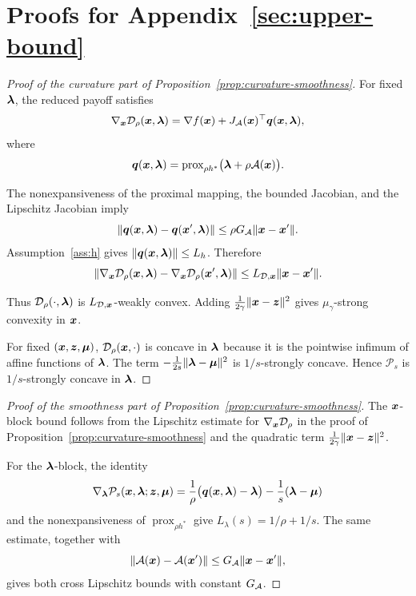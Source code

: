 \section{Proofs for Appendix~\ref{sec:upper-bound}}
\label{app:curvature-smoothness}

\begin{proof}[Proof of the curvature part of Proposition~\ref{prop:curvature-smoothness}]
For fixed $\bm{\lambda}$, the reduced payoff satisfies
\[
    \nabla_{\bm{x}}\mathcal D_\rho(\bm{x},\bm{\lambda})
    =
    \nabla f(\bm{x})+J_{\mathcal{A}}(\bm{x})^\top\bm{q}(\bm{x},\bm{\lambda}),
\]
where
\[
    \bm{q}(\bm{x},\bm{\lambda})
    =
    \operatorname{prox}_{\rho h^*}
    \bigl(\bm{\lambda}+\rho\mathcal{A}(\bm{x})\bigr).
\]

The nonexpansiveness of the proximal mapping, the bounded Jacobian, and
the Lipschitz Jacobian imply
\[
    \|\bm{q}(\bm{x},\bm{\lambda})-\bm{q}(\bm{x}',\bm{\lambda})\|
    \le \rho G_{\mathcal{A}}\|\bm{x}-\bm{x}'\|.
\]
Assumption~\ref{ass:h} gives
\(\|\bm{q}(\bm{x},\bm{\lambda})\|\le L_h\).  Therefore
\[
    \|\nabla_{\bm{x}}\mathcal D_\rho(\bm{x},\bm{\lambda})
    -\nabla_{\bm{x}}\mathcal D_\rho(\bm{x}',\bm{\lambda})\|
    \le L_{\mathcal{D},\bm{x}}\|\bm{x}-\bm{x}'\|.
\]

Thus $\mathcal D_\rho(\cdot,\bm{\lambda})$ is
$L_{\mathcal{D},\bm{x}}$-weakly convex.  Adding
$\frac{1}{2\gamma}\|\bm{x}-\bm{z}\|^2$ gives
$\mu_\gamma$-strong convexity in $\bm{x}$.

For fixed $(\bm{x},\bm{z},\bm{\mu})$, $\mathcal D_\rho(\bm{x},\cdot)$ is concave in
$\bm{\lambda}$ because it is the pointwise infimum of affine functions of
$\bm{\lambda}$.  The term
$-\frac{1}{2s}\|\bm{\lambda}-\bm{\mu}\|^2$ is $1/s$-strongly concave.  Hence
$\mathcal P_s$ is $1/s$-strongly concave in $\bm{\lambda}$.
\end{proof}

\begin{proof}[Proof of the smoothness part of Proposition~\ref{prop:curvature-smoothness}]
The $\bm{x}$-block bound follows from the Lipschitz estimate for
$\nabla_{\bm{x}}\mathcal D_\rho$ in the proof of
Proposition~\ref{prop:curvature-smoothness} and the quadratic term
$\frac{1}{2\gamma}\|\bm{x}-\bm{z}\|^2$.

For the $\bm{\lambda}$-block, the identity
\[
    \nabla_{\bm{\lambda}}\mathcal P_s(\bm{x},\bm{\lambda};\bm{z},\bm{\mu})
    =
    \frac{1}{\rho}
    \bigl(\bm{q}(\bm{x},\bm{\lambda})-\bm{\lambda}\bigr)
    -\frac{1}{s}(\bm{\lambda}-\bm{\mu})
\]
and the nonexpansiveness of
$\operatorname{prox}_{\rho h^*}$ give
$L_\lambda(s)=1/\rho+1/s$.
The same estimate, together with
\[
    \|\mathcal{A}(\bm{x})-\mathcal{A}(\bm{x}')\|
    \le G_{\mathcal{A}}\|\bm{x}-\bm{x}'\|,
\]
gives both cross Lipschitz bounds with constant $G_{\mathcal{A}}$.
\end{proof}

